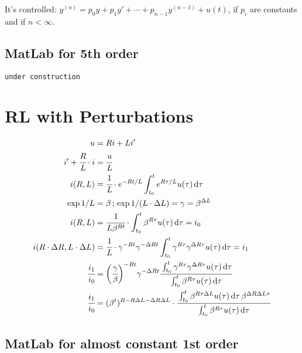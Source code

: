 \documentclass[11pt]{article}
\begin{document}
It's controlled: $y^{(n)} = p_0 y + p_1 y' + \cdots + p_{n-1} y^{(n-1)} + u(t)$, if $p_i$ are constants and if $n < \infty$.

\subsection{MatLab for 5th order}

\begin{verbatim}
under construction
\end{verbatim}

\section{RL with Perturbations}

\begin{align}
 u &= Ri + Li' \\
 i' + \cfrac{R}{L}\cdot i &= \cfrac{u}{L} \\
 i(R, L) &= \cfrac{1}{L}\cdot e^{-Rt/L} \int_{t_0}^t e^{R\tau/L} u(\tau)\,\mathrm{d}\tau \\
 \exp 1/L &= \beta\,;\,\exp 1/(L \cdot \Delta L) = \gamma = \beta^{\Delta L} \\
 i(R, L) &= \cfrac{1}{L\beta^{Rt} }\cdot \int_{t_0}^t \beta^{R\tau} u(\tau)\,\mathrm{d}\tau = i_0 \\
 i(R \cdot \Delta R, L \cdot \Delta L) &= \cfrac{1}{L}\cdot \gamma^{-Rt} \gamma^{-\Delta Rt} \int_{t_0}^t \gamma^{R\tau} \gamma^{\Delta R\tau} u(\tau)\,\mathrm{d}\tau  = i_1 \\
 \cfrac{i_1}{i_0} &= \bigg( \cfrac{\gamma}{\beta}\bigg) ^{-Rt} \gamma^{-\Delta Rt} \cfrac{\int_{t_0}^t \gamma^{R\tau} \gamma^{\Delta R\tau} u(\tau)\,\mathrm{d}\tau}{  \int_{t_0}^t \beta^{R\tau} u(\tau)\,\mathrm{d}\tau} \\
 \cfrac{i_1}{i_0} &= ( \beta^{t} )^{R - R\Delta L - \Delta R\Delta L}\cdot \cfrac{\int_{t_0}^t \beta^{R\tau \Delta L} u(\tau)\,\mathrm{d}\tau\, \beta^{\Delta R\Delta L\tau} }{  \int_{t_0}^t \beta^{R\tau} u(\tau)\,\mathrm{d}\tau}
\end{align}

\subsection{MatLab for almost constant 1st order}
\end{document}
